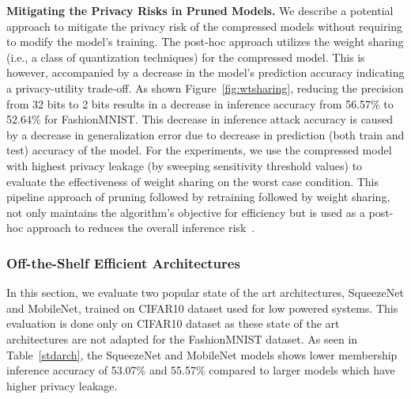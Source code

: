 \textbf{Mitigating the Privacy Risks in Pruned Models.} We describe a potential approach to mitigate the privacy risk of the compressed models without requiring to modify the model's training.
The post-hoc approach utilizes the weight sharing (i.e., a class of quantization techniques) for the compressed model. This is however, accompanied by a decrease in the model's prediction accuracy indicating a privacy-utility trade-off.
As shown Figure~\ref{fig:wtsharing}, reducing the precision from 32 bits to 2 bits results in a decrease in inference accuracy from 56.57\% to 52.64\% for FashionMNIST.
This decrease in inference attack accuracy is caused by a decrease in generalization error due to decrease in prediction (both train and test) accuracy of the model.
For the experiments, we use the compressed model with highest privacy leakage (by sweeping sensitivity threshold values) to evaluate the effectiveness of weight sharing on the worst case condition. %
This pipeline approach of pruning followed by retraining followed by weight sharing, not only maintains the algorithm's objective for efficiency but is used as a post-hoc approach to reduces the overall inference risk~\cite{DBLP:journals/corr/HanMD15,DBLP:journals/corr/HanPNMTECTD16}.






\subsubsection{Off-the-Shelf Efficient Architectures}

In this section, we evaluate two popular state of the art architectures, SqueezeNet and MobileNet, trained on CIFAR10 dataset used for low powered systems.
This evaluation is done only on CIFAR10 dataset as these state of the art architectures are not adapted for the FashionMNIST dataset.
As seen in Table~\ref{stdarch}, the SqueezeNet and MobileNet models shows lower membership inference accuracy of 53.07\% and 55.57\% compared to larger models which have higher privacy leakage.



